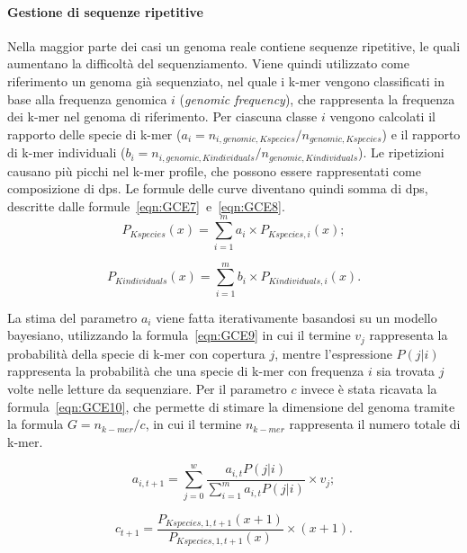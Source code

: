 \documentclass[crop=false, class=book]{standalone}
\begin{document}
	\paragraph{Gestione di sequenze ripetitive}
	Nella maggior parte dei casi un genoma reale contiene sequenze ripetitive, le quali aumentano la difficoltà del sequenziamento. Viene quindi utilizzato come riferimento un genoma già sequenziato, nel quale i k-mer vengono classificati in base alla frequenza genomica $i$ (\textit{genomic frequency}), che rappresenta la frequenza dei k-mer nel genoma di riferimento. Per ciascuna classe $i$ vengono calcolati il rapporto delle specie di k-mer ($a_i = n_{i, genomic, Kspecies} / n_{genomic, Kspecies}$) e il rapporto di k-mer individuali ($b_i = n_{i, genomic, Kindividuals} / n_{genomic, Kindividuals}$). 
	Le ripetizioni causano più picchi nel k-mer profile, che possono essere rappresentati come composizione di \glspl{dp}. Le formule delle curve diventano quindi somma di \glspl{dp}, descritte dalle formule~\vref{eqn:GCE7}~e~\vref{eqn:GCE8}.
	\begin{equation}
		\label{eqn:GCE7}
		P_{Kspecies}(x) = \sum_{i=1}^{m} a_i \times P_{Kspecies, i}(x);
	\end{equation}
	
	\begin{equation}
		\label{eqn:GCE8}
		P_{Kindividuals}(x) = \sum_{i=1}^{m} b_i \times P_{Kindividuals, i}(x).
	\end{equation}
	
	La stima del parametro $a_i$ viene fatta iterativamente basandosi su un modello bayesiano, utilizzando la formula~\vref{eqn:GCE9} in cui il termine $v_j$ rappresenta la probabilità della specie di k-mer con copertura $j$, mentre l'espressione $P(j|i)$ rappresenta la probabilità che una specie di k-mer con frequenza $i$ sia trovata $j$ volte nelle letture da sequenziare. Per il parametro $c$ invece è stata ricavata la formula~\vref{eqn:GCE10}, che permette di stimare la dimensione del genoma tramite la formula $G = n_{k-mer}/c$, in cui il termine $ n_{k-mer}$ rappresenta il numero totale di k-mer.
	
	\begin{equation}
		\label{eqn:GCE9}
		a_{i,t+1} = \sum_{j=0}^{w} \frac{a_{i,t} P(j|i)}{\sum_{i=1}^{m} a_{i,t} P(j|i)} \times v_j;
	\end{equation}

	\begin{equation}
		\label{eqn:GCE10}
		c_{t+1} = \frac{P_{Kspecies, 1, t+1}(x+1)}{P_{Kspecies, 1, t+1}(x)} \times (x+1).
	\end{equation}
	
\end{document}
